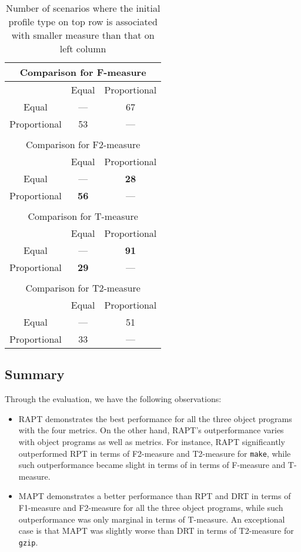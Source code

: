\documentclass[10pt,journal,compsoc]{IEEEtran}
\begin{document}
\begin{table}
\caption{Number of scenarios where the initial profile type on top row is associated with smaller measure than that on left column}
\label{tab:Psta}
\centering
\begin{tabular}{|c|c|c|}
\multicolumn{3}{c}{Comparison for F-measure} \\ \hline
						& Equal				& Proportional	\\ \hline
Equal					& ---				& 67			\\ \hline
Proportional	        & 53				& ---			\\ \hline
\multicolumn{3}{c}{ } \\
\multicolumn{3}{c}{Comparison for F2-measure} \\ \hline
					& Equal			& Proportional	\\ \hline
Equal				& ---			& \textbf{28}	\\ \hline
Proportional	    & \textbf{56}	& ---			\\ \hline
\multicolumn{3}{c}{ } \\
\multicolumn{3}{c}{Comparison for T-measure} \\ \hline
						& Equal			& Proportional	\\ \hline
Equal					& ---			& \textbf{91}	\\ \hline
Proportional	       	& \textbf{29}	& ---			\\ \hline
\multicolumn{3}{c}{ } \\
\multicolumn{3}{c}{Comparison for T2-measure} \\ \hline
						& Equal				& Proportional	\\ \hline
Equal					& ---				& 51			\\ \hline
Proportional	       	& 33					& ---			\\ \hline
\end{tabular}
\end{table}


\subsection{Summary }
Through the evaluation, we have the following observations:
\begin{itemize}
\item RAPT demonstrates the best performance for all the three object programs with the four metrics. On the other hand, RAPT's outperformance varies with object programs as well as metrics. For instance, RAPT significantly outperformed RPT in terms of F2-measure and T2-measure for \texttt{make}, while such outperformance became slight in terms of in terms of F-measure and T-measure.
\item MAPT demonstrates a better performance than RPT and DRT in terms of F1-measure and F2-measure for all the three object programs, while such outperformance was only marginal in terms of T-measure. An exceptional case is that MAPT was slightly worse than DRT in terms of T2-measure for \texttt{gzip}.
\end{itemize}
\end{document}
